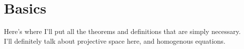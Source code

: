 \section{Basics}
Here's where I'll put all the theorems and definitions that
are simply necessary. I'll definitely talk about projective
space here, and homogenous equations.
